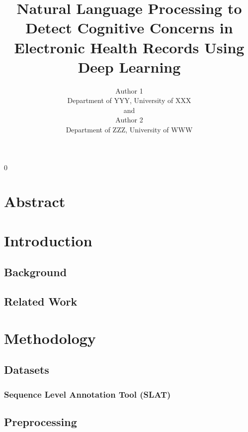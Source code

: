 \documentclass[12pt]{article}
\newcommand{\blind}{0}
\begin{document}
\blind {
    \title {
        \bf Natural Language Processing to Detect Cognitive Concerns in Electronic Health Records Using Deep Learning
    }
    
    \author {
        Author 1 \\
        Department of YYY, University of XXX\\
        and \\
        Author 2 \\
        Department of ZZZ, University of WWW
    }
    
    \maketitle
} \fi

\newpage
    \tableofcontents
\newpage

\section{Abstract}



\section{Introduction}
	\subsection{Background}

	\subsection{Related Work}

\section{Methodology}
	\subsection{Datasets}
		\subsubsection{Sequence Level Annotation Tool (SLAT)}
	
	\subsection{Preprocessing}
	
\end{document}

